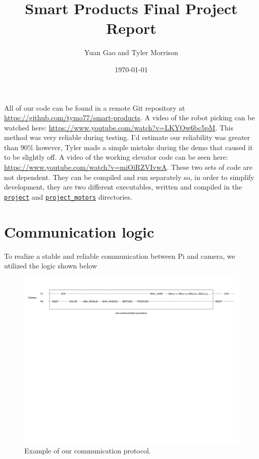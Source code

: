 \documentclass{article}
\title{Smart Products Final Project Report}
\author{Yuan Gao and Tyler Morrison}
\date\today
\begin{document}
\maketitle

All of our code can be found in a remote Git repository at \url{https://github.com/tymo77/smart-products}. A video of the robot picking can be watched here: \url{https://www.youtube.com/watch?v=LKYOw6bc5pM}. This method was very reliable during testing. I'd estimate our reliability was greater than 90\% however, Tyler made a simple mistake during the demo that caused it to be slightly off. A video of the working elevator code can be seen here: \url{https://www.youtube.com/watch?v=miOiRZVIvwA}. These two sets of code are not dependent. They can be compiled and run separately so, in order to simplify development, they are two different executables, written and compiled in the \href{https://github.com/tymo77/smart-products/tree/master/labs/project}{\texttt{project}} and \href{https://github.com/tymo77/smart-products/tree/master/labs/project_motors}{\texttt{project\_motors}} directories.


\section{Communication logic}
To realize a stable and reliable communication between Pi and camera, we utilized the logic shown below

\begin{figure}[H]
	\centering
	\includegraphics[keepaspectratio,width=.95\linewidth]{communication.pdf}
	\caption{Example of our communication protocol.}
\end{figure}
\end{document}
